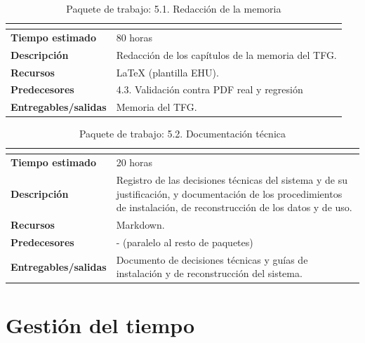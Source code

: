 \documentclass[11pt, a4paper]{report}
\begin{document}
	\begin{table}[H]
		\centering
		\begin{tabularx}{\linewidth}{|>{\bfseries}l|X|}
			\hline
			\rowcolor{pkg-documentacion}
			\multicolumn{2}{|c|}{\textcolor{white}{\textbf{5.1. Redacción de la memoria}}} \\
			\hline
			Tiempo estimado & 80 horas \\
			\hline
			\rowcolor{fila-alterna}
			Descripción & Redacción de los capítulos de la memoria del TFG. \\
			\hline
			Recursos & LaTeX (plantilla EHU). \\
			\hline
			\rowcolor{fila-alterna}
			Predecesores & 4.3. Validación contra PDF real y regresión \\
			\hline
			Entregables/salidas & Memoria del TFG. \\
			\hline
		\end{tabularx}
		\caption{Paquete de trabajo: 5.1. Redacción de la memoria}
		\label{tab:pkg-memoria}
	\end{table}

	\begin{table}[H]
		\centering
		\begin{tabularx}{\linewidth}{|>{\bfseries}l|X|}
			\hline
			\rowcolor{pkg-documentacion}
			\multicolumn{2}{|c|}{\textcolor{white}{\textbf{5.2. Documentación técnica}}} \\
			\hline
			Tiempo estimado & 20 horas \\
			\hline
			\rowcolor{fila-alterna}
			Descripción & Registro de las decisiones técnicas del sistema y de su justificación, y documentación de los procedimientos de instalación, de reconstrucción de los datos y de uso. \\
			\hline
			Recursos & Markdown. \\
			\hline
			\rowcolor{fila-alterna}
			Predecesores & - (paralelo al resto de paquetes) \\
			\hline
			Entregables/salidas & Documento de decisiones técnicas y guías de instalación y de reconstrucción del sistema. \\
			\hline
		\end{tabularx}
		\caption{Paquete de trabajo: 5.2. Documentación técnica}
		\label{tab:pkg-doc-tecnica}
	\end{table}

	\section{Gestión del tiempo}
\end{document}
